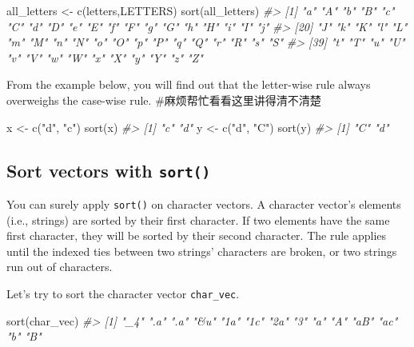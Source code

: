 \documentclass[
]{book}
\newenvironment{Shaded}{\begin{snugshade}}{\end{snugshade}}
\newcommand{\CommentTok}[1]{\textcolor[rgb]{0.56,0.35,0.01}{\textit{#1}}}
\newcommand{\FunctionTok}[1]{\textcolor[rgb]{0.00,0.00,0.00}{#1}}
\newcommand{\NormalTok}[1]{#1}
\newcommand{\OtherTok}[1]{\textcolor[rgb]{0.56,0.35,0.01}{#1}}
\newcommand{\StringTok}[1]{\textcolor[rgb]{0.31,0.60,0.02}{#1}}
\begin{document}
\begin{Shaded}
\begin{Highlighting}[]
\NormalTok{all\_letters }\OtherTok{\textless{}{-}} \FunctionTok{c}\NormalTok{(letters,LETTERS)}
\FunctionTok{sort}\NormalTok{(all\_letters)}
\CommentTok{\#\textgreater{}  [1] "a" "A" "b" "B" "c" "C" "d" "D" "e" "E" "f" "F" "g" "G" "h" "H" "i" "I" "j"}
\CommentTok{\#\textgreater{} [20] "J" "k" "K" "l" "L" "m" "M" "n" "N" "o" "O" "p" "P" "q" "Q" "r" "R" "s" "S"}
\CommentTok{\#\textgreater{} [39] "t" "T" "u" "U" "v" "V" "w" "W" "x" "X" "y" "Y" "z" "Z"}
\end{Highlighting}
\end{Shaded}

From the example below, you will find out that the letter-wise rule always overweighs the case-wise rule. \#麻烦帮忙看看这里讲得清不清楚

\begin{Shaded}
\begin{Highlighting}[]
\NormalTok{x }\OtherTok{\textless{}{-}} \FunctionTok{c}\NormalTok{(}\StringTok{"d"}\NormalTok{, }\StringTok{"c"}\NormalTok{)}
\FunctionTok{sort}\NormalTok{(x)}
\CommentTok{\#\textgreater{} [1] "c" "d"}
\NormalTok{y }\OtherTok{\textless{}{-}} \FunctionTok{c}\NormalTok{(}\StringTok{"d"}\NormalTok{, }\StringTok{"C"}\NormalTok{)}
\FunctionTok{sort}\NormalTok{(y)}
\CommentTok{\#\textgreater{} [1] "C" "d"}
\end{Highlighting}
\end{Shaded}

\hypertarget{sort-vectors-with-sort-1}{%
\subsection{\texorpdfstring{Sort vectors with \texttt{sort()}}{Sort vectors with sort()}}\label{sort-vectors-with-sort-1}}

You can surely apply \texttt{sort()} on character vectors. A character vector's elements (i.e., strings) are sorted by their first character. If two elements have the same first character, they will be sorted by their second character. The rule applies until the indexed ties between two strings' characters are broken, or two strings run out of characters.

Let's try to sort the character vector \texttt{char\_vec}.

\begin{Shaded}
\begin{Highlighting}[]
\FunctionTok{sort}\NormalTok{(char\_vec)}
\CommentTok{\#\textgreater{}  [1] "\_4" ".a" ".a" "\&u" "1a" "1c" "2a" "3"  "a"  "A"  "aB" "ac" "b"  "B"}
\end{Highlighting}
\end{Shaded}
\end{document}
